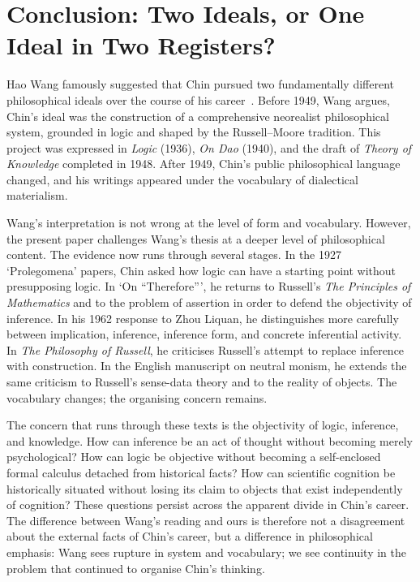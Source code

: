 \documentclass{birkjour}
\begin{document}
\section{Conclusion: Two Ideals, or One Ideal in Two Registers?}\label{sec:conclusion}

Hao Wang famously suggested that Chin pursued two fundamentally different philosophical ideals over the course of his career~\cite{Wang1984}. Before 1949, Wang argues, Chin's ideal was the construction of a comprehensive neorealist philosophical system, grounded in logic and shaped by the Russell--Moore tradition. This project was expressed in \textit{Logic} (1936), \textit{On Dao} (1940), and the draft of \textit{Theory of Knowledge} completed in 1948. After 1949, Chin's public philosophical language changed, and his writings appeared under the vocabulary of dialectical materialism.

Wang's interpretation is not wrong at the level of form and vocabulary. However, the present paper challenges Wang's thesis at a deeper level of philosophical content. The evidence now runs through several stages. In the 1927 `Prolegomena' papers, Chin asked how logic can have a starting point without presupposing logic. In `On ``Therefore''', he returns to Russell's \textit{The Principles of Mathematics} and to the problem of assertion in order to defend the objectivity of inference. In his 1962 response to Zhou Liquan, he distinguishes more carefully between implication, inference, inference form, and concrete inferential activity. In \textit{The Philosophy of Russell}, he criticises Russell's attempt to replace inference with construction. In the English manuscript on neutral monism, he extends the same criticism to Russell's sense-data theory and to the reality of objects. The vocabulary changes; the organising concern remains.

The concern that runs through these texts is the objectivity of logic, inference, and knowledge. How can inference be an act of thought without becoming merely psychological? How can logic be objective without becoming a self-enclosed formal calculus detached from historical facts? How can scientific cognition be historically situated without losing its claim to objects that exist independently of cognition? These questions persist across the apparent divide in Chin's career. The difference between Wang's reading and ours is therefore not a disagreement about the external facts of Chin's career, but a difference in philosophical emphasis: Wang sees rupture in system and vocabulary; we see continuity in the problem that continued to organise Chin's thinking.
\end{document}

